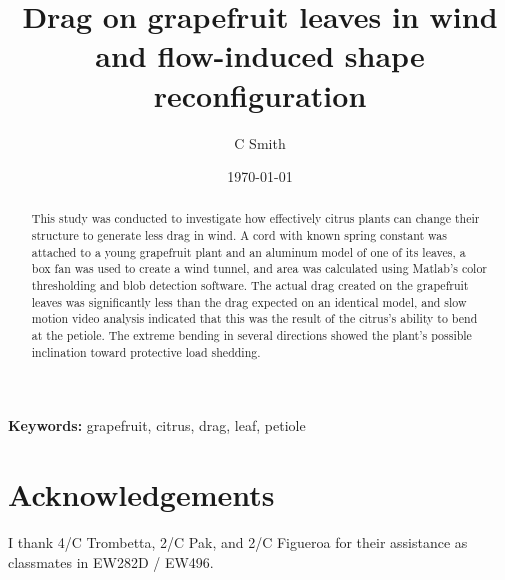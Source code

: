 \documentclass[]{article}
\title{Drag on grapefruit leaves in wind and flow-induced shape reconfiguration}
\author{C Smith}
\date{\today}
\newcommand{\Matlab}{Matlab}
\begin{document}
\maketitle
\begin{abstract}
This study was conducted to investigate how effectively citrus plants can change their structure to generate less drag in wind. A cord with known spring constant was attached to a young grapefruit plant and an aluminum model of one of its leaves, a box fan was used to create a wind tunnel, and area was calculated using \Matlab's color thresholding and blob detection software. The actual drag created on the grapefruit leaves was significantly less than the drag expected on an identical model, and slow motion video analysis indicated that this was the result of the citrus's ability to bend at the petiole. The extreme bending in several directions showed the plant's possible inclination toward protective load shedding.
\end{abstract}
{\scriptsize\textbf{Keywords: }grapefruit, citrus, drag, leaf, petiole}


\section{Acknowledgements}
I thank 4/C Trombetta, 2/C Pak, and 2/C Figueroa for their assistance as classmates in EW282D / EW496. 



\clearpage
\appendix

\end{document}
